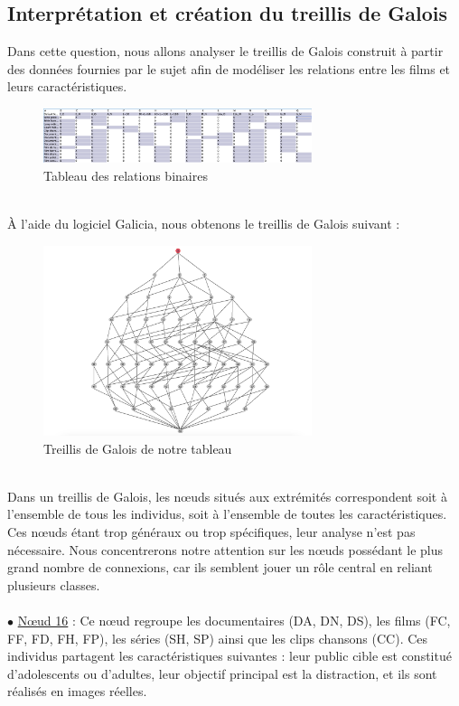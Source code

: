 \documentclass{article}
\begin{document}
\subsection{Interprétation et création du treillis de Galois}
Dans cette question, nous allons analyser le treillis de Galois construit à partir des données fournies par le sujet afin de modéliser les relations entre les films et leurs caractéristiques.
\begin{figure}[h]
    \centering
    \includegraphics[width=0.7\textwidth]{tableau.png}
    \caption{Tableau des relations binaires}
    \label{fig:tableau} 
\end{figure}
\\
À l'aide du logiciel Galicia, nous obtenons le treillis de Galois suivant :
\begin{figure}[h]
    \centering
    \includegraphics[width=0.7\textwidth]{treillis.png}
    \caption{Treillis de Galois de notre tableau}
    \label{fig:treillis} 
\end{figure}
\\
Dans un treillis de Galois, les nœuds situés aux extrémités correspondent soit à l’ensemble de tous les individus, soit à l’ensemble de toutes les caractéristiques. Ces nœuds étant trop généraux ou trop spécifiques, leur analyse n’est pas nécessaire. Nous concentrerons notre attention sur les nœuds possédant le plus grand nombre de connexions, car ils semblent jouer un rôle central en reliant plusieurs classes.
\\\\
\noindent $\bullet$ \underline{Nœud 16} : Ce nœud regroupe les documentaires (DA, DN, DS), les films (FC, FF, FD, FH, FP), les séries (SH, SP) ainsi que les clips chansons (CC). Ces individus partagent les caractéristiques suivantes : leur public cible est constitué d’adolescents ou d’adultes, leur objectif principal est la distraction, et ils sont réalisés en images réelles.
\end{document}
